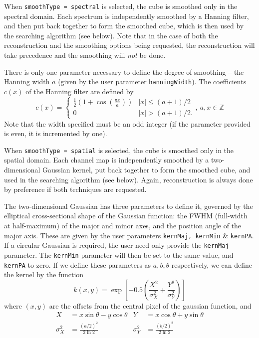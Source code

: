 
When \texttt{smoothType = spectral} is selected, the cube is smoothed
only in the spectral domain. Each spectrum is independently smoothed
by a Hanning filter, and then put back together to form the smoothed
cube, which is then used by the searching algorithm (see below). Note
that in the case of both the reconstruction and the smoothing options
being requested, the reconstruction will take precedence and the
smoothing will \emph{not} be done.

There is only one parameter necessary to define the degree of
smoothing -- the Hanning width $a$ (given by the user parameter
\texttt{hanningWidth}). The coefficients $c(x)$ of the Hanning filter
are defined by
\[
c(x) = 
  \begin{cases}
   \frac{1}{2}\left(1+\cos(\frac{\pi x}{a})\right) &|x| \leq (a+1)/2\\
   0                                               &|x| > (a+1)/2.
  \end{cases},\ a,x \in \mathbb{Z}
\]
Note that the width specified must be an
odd integer (if the parameter provided is even, it is incremented by
one).


When \texttt{smoothType = spatial} is selected, the cube is smoothed
only in the spatial domain. Each channel map is independently smoothed
by a two-dimensional Gaussian kernel, put back together to form the
smoothed cube, and used in the searching algorithm (see below). Again,
reconstruction is always done by preference if both techniques are
requested.

The two-dimensional Gaussian has three parameters to define it,
governed by the elliptical cross-sectional shape of the Gaussian
function: the FWHM (full-width at half-maximum) of the major and minor
axes, and the position angle of the major axis. These are given by the
user parameters \texttt{kernMaj, kernMin} \& \texttt{kernPA}. If a
circular Gaussian is required, the user need only provide the
\texttt{kernMaj} parameter. The \texttt{kernMin} parameter will then
be set to the same value, and \texttt{kernPA} to zero.  If we define
these parameters as $a,b,\theta$ respectively, we can define the
kernel by the function
\[ 
k(x,y) = \exp\left[-0.5 \left(\frac{X^2}{\sigma_X^2} + 
                              \frac{Y^2}{\sigma_Y^2}   \right) \right] 
\]
where $(x,y)$ are the offsets from the central pixel of the gaussian
function, and 
\begin{align*}
X& = x\sin\theta - y\cos\theta&
  Y&= x\cos\theta + y\sin\theta\\
\sigma_X^2& = \frac{(a/2)^2}{2\ln2}&
  \sigma_Y^2& = \frac{(b/2)^2}{2\ln2}\\
\end{align*}

